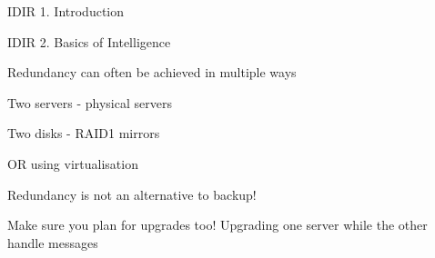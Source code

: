 \documentclass[Screen16to9,17pt]{foils}
\begin{document}
\begin{list1}
\item IDIR 1. Introduction
\begin{list2}
\item
\end{list2}
\end{list1}



\begin{quote}

\end{quote}

\begin{list1}
\item IDIR 2. Basics of Intelligence
\begin{list2}
\item
\end{list2}
\end{list1}





\begin{list1}
\item
\end{list1}






\begin{quote}

\end{quote}

\begin{list2}
\item Redundancy can often be achieved in multiple ways
\item Two servers - physical servers
\item Two disks - RAID1 mirrors
\item OR using virtualisation
\item Redundancy is not an alternative to backup!
\item Make sure you plan for upgrades too! Upgrading one server while the other handle messages
\end{list2}




\end{document}
